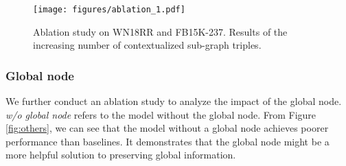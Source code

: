 \documentclass[sigconf]{acmart}
\begin{document}
\begin{figure}
    \centering  

    \texttt{[image: figures/ablation\_1.pdf]}

    \caption{Ablation study on WN18RR and FB15K-237.
    Results of the increasing number of contextualized sub-graph triples.
    }

    \label{fig:context_number}
\end{figure}

\subsubsection{\textbf{Global node}}
We further conduct an ablation study to analyze the impact of the global node.
\textit{w/o global node} refers to the model without the global node.
From Figure \ref{fig:others}, we can see that the model without a global node achieves poorer performance than baselines. 
It demonstrates that the global node might be a more helpful solution to preserving global information.
\end{document}
